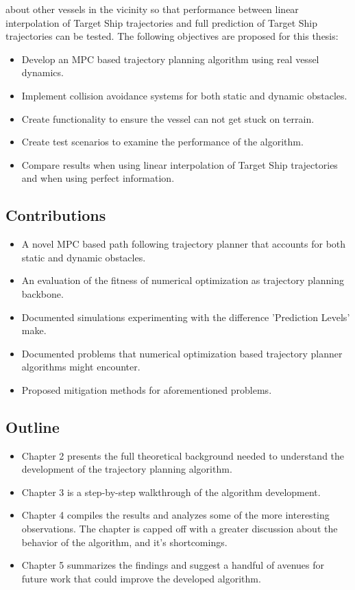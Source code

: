 about other vessels in the vicinity so that performance between linear interpolation of Target Ship trajectories
and full prediction of Target Ship trajectories can be tested.
The following objectives are proposed for this thesis:
\begin{itemize}
    \item Develop an MPC based trajectory planning algorithm using real vessel dynamics.
    \item Implement collision avoidance systems for both static and dynamic obstacles.
    \item Create functionality to ensure the vessel can not get stuck on terrain.
    \item Create test scenarios to examine the performance of the algorithm.
    \item Compare results when using linear interpolation of Target Ship trajectories and when using perfect information.
\end{itemize}


\subsection{Contributions}
\begin{itemize}
    \item A novel MPC based path following trajectory planner that accounts for both static and dynamic obstacles.
    \item An evaluation of the fitness of numerical optimization as trajectory planning backbone.
    \item Documented simulations experimenting with the difference 'Prediction Levels' make.
    \item Documented problems that numerical optimization based trajectory planner algorithms might encounter.
    \item Proposed mitigation methods for aforementioned problems.
\end{itemize}

\subsection{Outline}
\begin{itemize}
    \item Chapter 2 presents the full theoretical background needed to understand the development of the trajectory planning algorithm.
    \item Chapter 3 is a step-by-step walkthrough of the algorithm development.
    \item Chapter 4 compiles the results and analyzes some of the more interesting observations. The chapter is capped off with a greater
    discussion about the behavior of the algorithm, and it's shortcomings.
    \item Chapter 5 summarizes the findings and suggest a handful of avenues for future work that could improve the developed algorithm.
\end{itemize}


\newpage